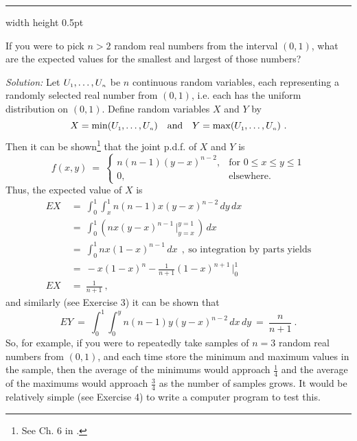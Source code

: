 \medskip
\hrule width \textwidth height 0.5pt
\begin{exmp}\label{exmp:minmaxexpval}
 If you were to pick $n > 2$ random real numbers from the interval $(0,1)$, what are the expected values for the
 smallest and largest of those numbers?\smallskip
 \par\noindent \emph{Solution:} Let $U_{\scriptscriptstyle 1}, \dots , U_{\scriptscriptstyle n}$ be $n$ continuous random variables,
 each representing a randomly selected real number from $(0,1)$, i.e. each has the uniform distribution on $(0,1)$.
 Define random variables $X$ and $Y$ by
 \begin{displaymath}
  X = \min(U_{\scriptscriptstyle 1}, \dots , U_{\scriptscriptstyle n}) \quad \text{and} \quad Y = \max(U_{\scriptscriptstyle 1}, \dots , U_{\scriptscriptstyle n}) ~.
 \end{displaymath}
 Then it can be shown\footnote{See Ch. 6 in \cite{hps}.} that the joint p.d.f. of $X$ and $Y$ is
\begin{equation}\label{eqn:minmaxexpval}
 f(x,y) ~=~ \begin{cases}
  n(n-1)(y-x)^{n-2}, &\text{for $0 \le x \le y \le 1$}\\
  0, &\text{elsewhere.}
 \end{cases}
\end{equation}
Thus, the expected value of $X$ is
\begin{align*}
 EX ~&=~ \int_0^1 \int_x^1 n(n-1)x(y-x)^{n-2} \,dy\,dx\\
  &=~ \int_0^1 \left( nx(y-x)^{n-1} \,\Big|_{y=x}^{y=1} \,\right)\,dx\\
  &=~ \int_0^1 nx(1-x)^{n-1} \,dx~~,~\text{so integration by parts yields}\\
  &=~ -x(1-x)^n - \frac{1}{n+1}(1-x)^{n+1} \,\Big|_0^1\\
 EX ~&=~ \frac{1}{n+1} ~,
\end{align*}
and similarly (see Exercise 3) it can be shown that
\begin{displaymath}
 EY ~=~ \int_0^1 \int_0^y n(n-1)y(y-x)^{n-2} \,dx\,dy ~=~ \frac{n}{n+1} ~.
\end{displaymath}
So, for example, if you were to repeatedly take samples of $n=3$ random real numbers from $(0,1)$, and each time store
the minimum and maximum values in the sample, then the average of the minimums would approach $\frac{1}{4}$ and the
average of the maximums would approach $\frac{3}{4}$ as the number of samples grows. It would be relatively simple (see
Exercise 4) to write a computer program to test this.
\end{exmp}
\startexercises\label{sec3dot7}
